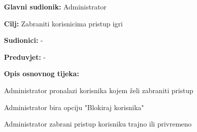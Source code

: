 					
										\noindent {}
					\begin{packed_item}
	
						\item \textbf{Glavni sudionik: } Administrator
						\item  \textbf{Cilj:} Zabraniti korisnicima pristup igri
						\item  \textbf{Sudionici:} -
						\item  \textbf{Preduvjet:} -
						\item  \textbf{Opis osnovnog tijeka:}
						
						\item[] \begin{packed_enum}
	
							    \item Administrator pronalazi korisnika kojem želi zabraniti pristup
    							\item Administrator bira opciju "Blokiraj korisnika"
    							\item Administrator zabrani pristup korisniku trajno ili privremeno
						\end{packed_enum}
					\end{packed_item}
					
